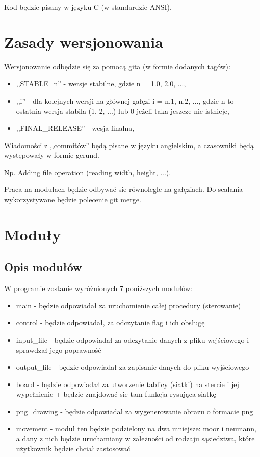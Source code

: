 \documentclass{article}
\begin{document}
Kod będzie pisany w języku C (w standardzie ANSI).

\section{Zasady wersjonowania}

Wersjonowanie odbędzie się za pomocą gita (w formie dodanych tagów):

\begin{itemize}
\item
,,STABLE\_n'' - wersje stabilne, gdzie n = 1.0, 2.0, ...,
\item 
,,i'' - dla kolejnych wersji na głównej gałęzi i = n.1, n.2, ..., gdzie n to ostatnia wersja stabila (1, 2, ...) lub 0 jeżeli taka jeszcze nie istnieje,
\item
,,FINAL\_RELEASE'' - wesja finalna,
\end{itemize} 


Wiadomości z ,,commitów'' będą pisane w języku angielskim, a czasowniki będą występowały w formie gerund.

Np. Adding file operation (reading width, height, ...).

Praca na modułach będzie odbywać sie równolegle na gałęziach. Do scalania wykorzystywane będzie polecenie git merge.




\section{Moduły}

\subsection{Opis modułów}
W programie zostanie wyróżnionych 7 poniższych modułów:
\begin{itemize}
\item main - będzie odpowiadał za uruchomienie całej procedury (sterowanie)
\item control - będzie odpowiadał, za odczytanie flag i ich obsługę
\item input\_file - będzie odpowiadał za odczytanie danych z pliku wejściowego i sprawdzał jego poprawność
\item output\_file - będzie odpowiadał za zapisanie danych do pliku wyjściowego
\item board - będzie odpowiadał za utworzenie tablicy (siatki) na stercie i jej wypełnienie + będzie znajdować sie tam funkcja rysująca siatkę
\item png\_drawing - będzie odpowiadał za wygenerowanie obrazu o formacie png 
\item movement - moduł ten będzie podzielony na dwa mniejsze: moor i neumann, a dany z nich będzie uruchamiany w zależności od rodzaju sąsiedztwa, które użytkownik będzie chciał zastosować
\end{itemize}
\end{document}
